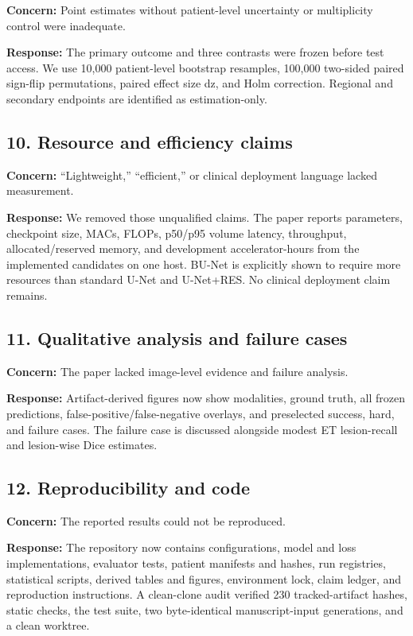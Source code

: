 \documentclass[
  10pt,
  letterpaper,
]{article}
\begin{document}
\textbf{Concern:} Point estimates without patient-level uncertainty or
multiplicity control were inadequate.

\textbf{Response:} The primary outcome and three contrasts were frozen
before test access. We use 10,000 patient-level bootstrap resamples,
100,000 two-sided paired sign-flip permutations, paired effect size dz,
and Holm correction. Regional and secondary endpoints are identified as
estimation-only.

\subsection{10. Resource and efficiency
claims}\label{resource-and-efficiency-claims}

\textbf{Concern:} ``Lightweight,'' ``efficient,'' or clinical deployment
language lacked measurement.

\textbf{Response:} We removed those unqualified claims. The paper
reports parameters, checkpoint size, MACs, FLOPs, p50/p95 volume
latency, throughput, allocated/reserved memory, and development
accelerator-hours from the implemented candidates on one host. BU-Net is
explicitly shown to require more resources than standard U-Net and
U-Net+RES. No clinical deployment claim remains.

\subsection{11. Qualitative analysis and failure
cases}\label{qualitative-analysis-and-failure-cases}

\textbf{Concern:} The paper lacked image-level evidence and failure
analysis.

\textbf{Response:} Artifact-derived figures now show modalities, ground
truth, all frozen predictions, false-positive/false-negative overlays,
and preselected success, hard, and failure cases. The failure case is
discussed alongside modest ET lesion-recall and lesion-wise Dice
estimates.

\subsection{12. Reproducibility and
code}\label{reproducibility-and-code}

\textbf{Concern:} The reported results could not be reproduced.

\textbf{Response:} The repository now contains configurations, model and
loss implementations, evaluator tests, patient manifests and hashes, run
registries, statistical scripts, derived tables and figures, environment
lock, claim ledger, and reproduction instructions. A clean-clone audit
verified 230 tracked-artifact hashes, static checks, the test suite, two
byte-identical manuscript-input generations, and a clean worktree.
\end{document}

